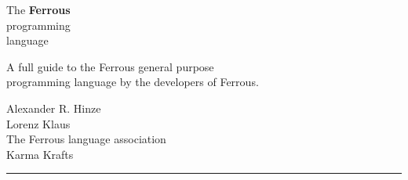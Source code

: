 \documentclass[11pt]{article}
\begin{document}
    \pagecolor{primary_bg}
     \color{secondary_fg} \selectfont


    \begin{titlepage}
        \colorbox{secondary_bg}{
            \colorbox{primary_fg}{
                \parbox[t]{0.93 \textwidth}{ %
                    \parbox[t]{0.91 \textwidth}{ %
                        \raggedleft %
                        \fontsize{50pt}{80pt} \selectfont %
                        \vspace{0.7cm} %

                        The \textbf{Ferrous}\\
                        programming\\
                        language\\

                        \vspace{0.7cm} %
                    }
                }
            }
        }

        \begin{center}
            \fontsize{16}{0} \selectfont
            A full guide to the Ferrous general purpose\\
            programming language by the developers of Ferrous.
            \normalfont \selectfont
        \end{center}

        \vfill %

        \parbox[t]{0.93 \textwidth}{ %
            \raggedleft %
            \large %
            {\Large Alexander R. Hinze}\\[4pt] %
            {\Large Lorenz Klaus}\\[4pt] %
            The Ferrous language association\\
            Karma Krafts

            \hfill \rule {0.2 \linewidth}{1pt} %
        }
    \end{titlepage}
\end{document}
